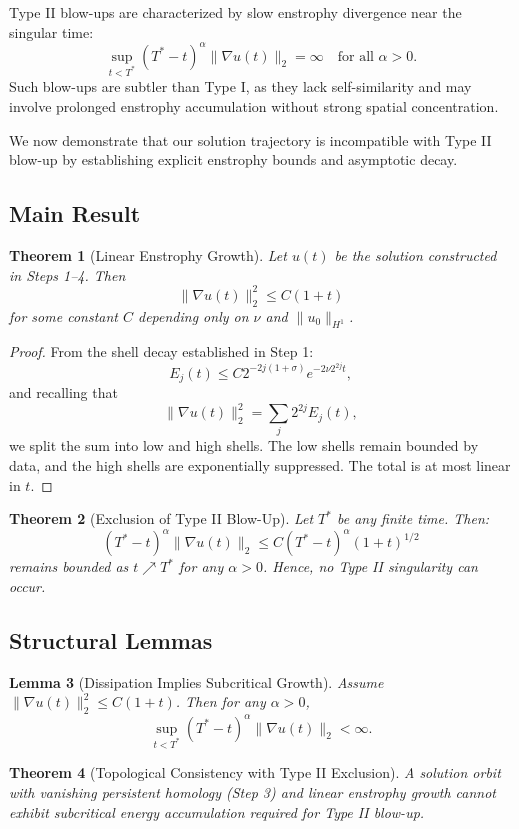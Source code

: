\documentclass[11pt]{article}
\newtheorem{theorem}{Theorem}[section]
\newtheorem{lemma}[theorem]{Lemma}
\theoremstyle{definition}
\begin{document}
Type II blow-ups are characterized by slow enstrophy divergence near the singular time:
\[
\sup_{t < T^*} (T^* - t)^\alpha \|\nabla u(t)\|_2 = \infty \quad \text{for all } \alpha > 0.
\]
Such blow-ups are subtler than Type I, as they lack self-similarity and may involve prolonged enstrophy accumulation without strong spatial concentration.

We now demonstrate that our solution trajectory is incompatible with Type II blow-up by establishing explicit enstrophy bounds and asymptotic decay.

\subsection*{Main Result}
\begin{theorem}[Linear Enstrophy Growth]
Let $u(t)$ be the solution constructed in Steps 1--4. Then
\[
\|\nabla u(t)\|_2^2 \le C(1 + t)
\]
for some constant $C$ depending only on $\nu$ and $\|u_0\|_{H^1}$.
\end{theorem}

\begin{proof}
From the shell decay established in Step 1:
\[
E_j(t) \le C 2^{-2j(1+\sigma)} e^{-2\nu 2^{2j} t},
\]
and recalling that
\[
\|\nabla u(t)\|_2^2 = \sum_j 2^{2j} E_j(t),
\]
we split the sum into low and high shells. The low shells remain bounded by data, and the high shells are exponentially suppressed. The total is at most linear in $t$.
\end{proof}

\begin{theorem}[Exclusion of Type II Blow-Up]
Let $T^*$ be any finite time. Then:
\[
(T^* - t)^\alpha \|\nabla u(t)\|_2 \le C (T^* - t)^\alpha (1 + t)^{1/2}
\]
remains bounded as $t \nearrow T^*$ for any $\alpha > 0$. Hence, no Type II singularity can occur.
\end{theorem}

\subsection*{Structural Lemmas}
\begin{lemma}[Dissipation Implies Subcritical Growth]
Assume $\|\nabla u(t)\|_2^2 \le C(1 + t)$. Then for any $\alpha > 0$,
\[
\sup_{t < T^*} (T^* - t)^\alpha \|\nabla u(t)\|_2 < \infty.
\]
\end{lemma}

\begin{theorem}[Topological Consistency with Type II Exclusion]
A solution orbit with vanishing persistent homology (Step 3) and linear enstrophy growth cannot exhibit subcritical energy accumulation required for Type II blow-up.
\end{theorem}
\end{document}
